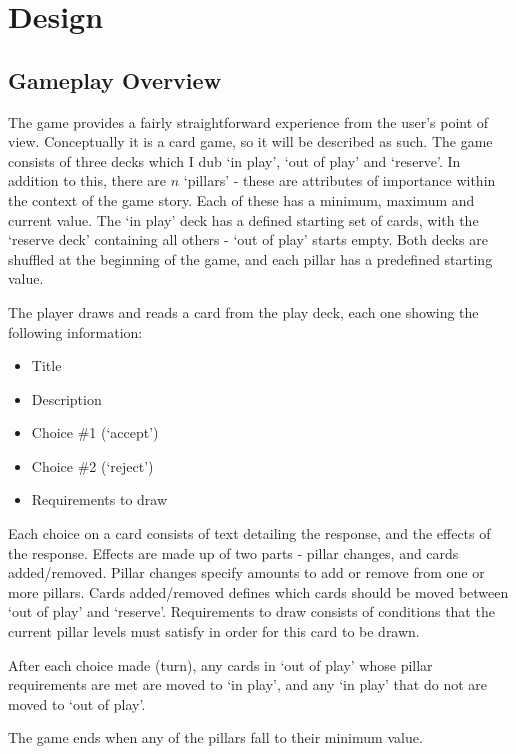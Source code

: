 \chapter{Design}

\section{Gameplay Overview}
The game provides a fairly straightforward experience from the user's point of view.
Conceptually it is a card game, so it will be described as such.
The game consists of three decks which I dub `in play', `out of play' and `reserve'. In addition to this, there are $n$ `pillars' - these are attributes of importance within the context of the game story. Each of these has a minimum, maximum and current value.
The `in play' deck has a defined starting set of cards, with the `reserve deck' containing all others - `out of play' starts empty.
Both decks are shuffled at the beginning of the game, and each pillar has a predefined starting value.

The player draws and reads a card from the play deck, each one showing the following information:

\begin{itemize}
	\item Title
	\item Description
	\item Choice \#1 (`accept')
	\item Choice \#2 (`reject')
	\item Requirements to draw
\end{itemize}
Each choice on a card consists of text detailing the response, and the effects of the response. Effects are made up of two parts - pillar changes, and cards added/removed. Pillar changes specify amounts to add or remove from one or more pillars. Cards added/removed defines which cards should be moved between `out of play' and `reserve'.
Requirements to draw consists of conditions that the current pillar levels must satisfy in order for this card to be drawn.

After each choice made (turn), any cards in `out of play' whose pillar requirements are met are moved to `in play', and any `in play' that do not are moved to `out of play'.

The game ends when any of the pillars fall to their minimum value.

